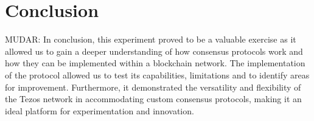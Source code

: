 \section{Conclusion}

MUDAR:
In conclusion, this experiment proved to be a valuable exercise as it allowed us to gain a deeper understanding of how consensus protocols work and how they can be implemented within a blockchain network. The implementation of the protocol allowed us to test its capabilities, limitations and to identify areas for improvement. Furthermore, it demonstrated the versatility and flexibility of the Tezos network in accommodating custom consensus protocols, making it an ideal platform for experimentation and innovation.
